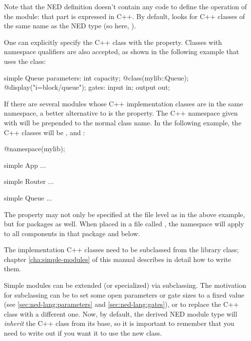 Note that the NED definition doesn't contain any code to define the
operation of the module: that part is expressed in C++. By default, {\opp}
looks for C++ classes of the same name as the NED type (so here, ).

One can explicitly specify the C++ class with the  property.
Classes with namespace qualifiers are also accepted, as shown in the following
example that uses the  class:

\begin{ned}
simple Queue
{
    parameters:
        int capacity;
        @class(mylib::Queue);
        @display("i=block/queue");
    gates:
        input in;
        output out;
}
\end{ned}

If there are several modules whose C++ implementation classes are in the same
namespace, a better alternative to  is the  property.
The C++ namespace given with  will be prepended to the normal
class name. In the following example, the C++ classes will be ,
 and :

\begin{ned}
@namespace(mylib);

simple App {
   ...
}

simple Router {
   ...
}

simple Queue {
   ...
}
\end{ned}

The  property may not only be specified at the file level as
in the above example, but for packages as well. When placed in a file
called , the namespace will apply to all components in
that package and below.

The implementation C++ classes need to be subclassed from the
 library class; chapter \ref{cha:simple-modules} of
this manual describes in detail how to write them.

Simple modules can be extended (or specialized) via subclassing. The
motivation for subclassing can be to set some open parameters or gate sizes
to a fixed value (see \ref{sec:ned-lang:parameters} and
\ref{sec:ned-lang:gates}), or to replace the C++ class with a different
one. Now, by default, the derived NED module type will \textit{inherit} the
C++ class from its base, so it is important to remember that you need to
write out  if you want it to use the new class.

